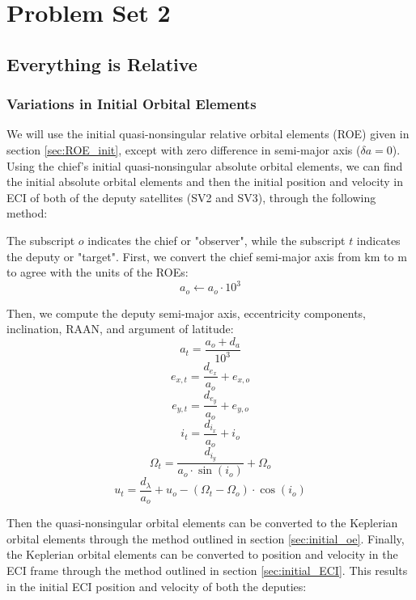 \section{Problem Set 2}
\subsection{Everything is Relative}

\subsubsection{Variations in Initial Orbital Elements} \label{sec:rel_init_oe}
We will use the initial quasi-nonsingular relative orbital elements (ROE) given in section \ref{sec:ROE_init}, except with zero difference in semi-major axis ($\delta a =0$). Using the chief's initial quasi-nonsingular absolute orbital elements, we can find the initial absolute orbital elements and then the initial position and velocity in ECI of both of the deputy satellites (SV2 and SV3), through the following method: 

The subscript $o$ indicates the chief or "observer", while the subscript $t$ indicates the deputy or "target". First, we convert the chief semi-major axis from km to m to agree with the units of the ROEs:
\[
a_o \leftarrow a_o \cdot 10^3
\]

Then, we compute the deputy semi-major axis, eccentricity components, inclination, RAAN, and argument of latitude:
\[
a_t = \frac{a_o + d_a}{10^3}
\]
\[
e_{x,t} = \frac{d_{e_x}}{a_o} + e_{x,o}
\]
\[
e_{y,t} = \frac{d_{e_y}}{a_o} + e_{y,o}
\]
\[
i_t = \frac{d_{i_x}}{a_o}  + i_o
\]
\[
\Omega_t = \frac{d_{i_y}}{a_o \cdot \sin(i_o)}  + \Omega_o
\]
\[
u_t =  \frac{d_\lambda}{a_o}+ u_o - (\Omega_t - \Omega_o) \cdot \cos(i_o)
\]

Then the quasi-nonsingular orbital elements can be converted to the Keplerian orbital elements through the method outlined in section \ref{sec:initial_oe}. Finally, the Keplerian orbital elements can be converted to position and velocity in the ECI frame through the method outlined in section \ref{sec:initial_ECI}. This results in the initial ECI position and velocity of both the deputies: 

